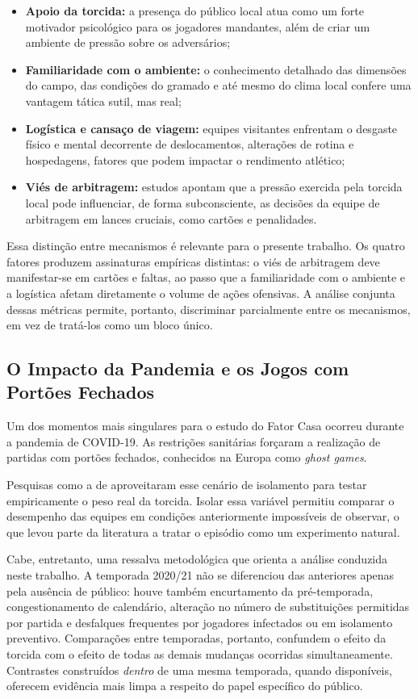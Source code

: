 \begin{itemize}
  \item \textbf{Apoio da torcida:} a presença do público local atua como um
    forte motivador psicológico para os jogadores mandantes, além de criar um
    ambiente de pressão sobre os adversários;
  \item \textbf{Familiaridade com o ambiente:} o conhecimento detalhado das
    dimensões do campo, das condições do gramado e até mesmo do clima local
    confere uma vantagem tática sutil, mas real;
  \item \textbf{Logística e cansaço de viagem:} equipes visitantes enfrentam o
    desgaste físico e mental decorrente de deslocamentos, alterações de rotina e
    hospedagens, fatores que podem impactar o rendimento atlético;
  \item \textbf{Viés de arbitragem:} estudos apontam que a pressão exercida pela
    torcida local pode influenciar, de forma subconsciente, as decisões da
    equipe de arbitragem em lances cruciais, como cartões e penalidades.
\end{itemize}

Essa distinção entre mecanismos é relevante para o presente trabalho. Os quatro
fatores produzem assinaturas empíricas distintas: o viés de arbitragem deve
manifestar-se em cartões e faltas, ao passo que a familiaridade com o ambiente e
a logística afetam diretamente o volume de ações ofensivas. A análise conjunta
dessas métricas permite, portanto, discriminar parcialmente entre os mecanismos,
em vez de tratá-los como um bloco único.

\subsection{O Impacto da Pandemia e os Jogos com Portões Fechados}\label{sec:covid}

Um dos momentos mais singulares para o estudo do Fator Casa ocorreu durante a
pandemia de COVID-19. As restrições sanitárias forçaram a realização de partidas
com portões fechados, conhecidos na Europa como \textit{ghost games}.

Pesquisas como a de  aproveitaram esse cenário de
isolamento para testar empiricamente o peso real da torcida. Isolar essa variável
permitiu comparar o desempenho das equipes em condições anteriormente
impossíveis de observar, o que levou parte da literatura a tratar o episódio como
um experimento natural.

Cabe, entretanto, uma ressalva metodológica que orienta a análise conduzida neste
trabalho. A temporada 2020/21 não se diferenciou das anteriores apenas pela
ausência de público: houve também encurtamento da pré-temporada, congestionamento
de calendário, alteração no número de substituições permitidas por partida e
desfalques frequentes por jogadores infectados ou em isolamento preventivo.
Comparações entre temporadas, portanto, confundem o efeito da torcida com o
efeito de todas as demais mudanças ocorridas simultaneamente. Contrastes
construídos \textit{dentro} de uma mesma temporada, quando disponíveis, oferecem
evidência mais limpa a respeito do papel específico do público.

